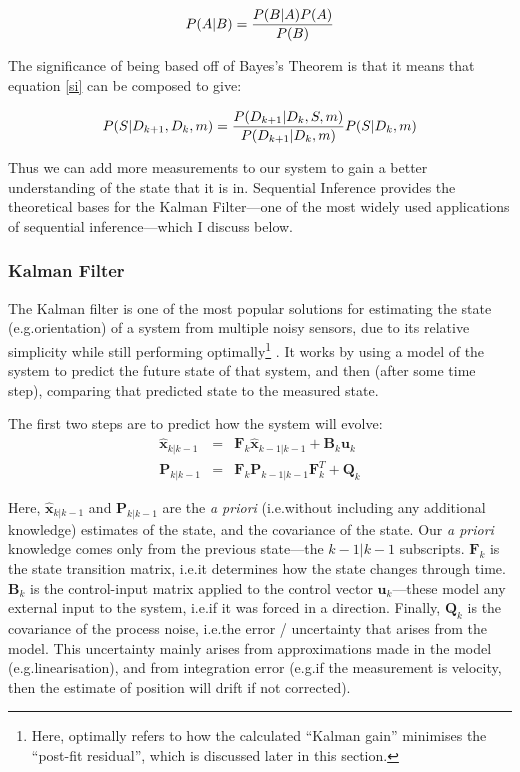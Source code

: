 \documentclass[12pt]{article}
\begin{document}
\begin{equation}
	P(A | B) = {P(B|A) P(A) \over P(B)}
\end{equation}

The significance of being based off of Bayes's Theorem is that it means that equation \ref{si} can be composed to give:

\begin{equation}
	P(S|D_{k+1},D_k,m) = {P(D_{k+1}|D_k,S,m) \over P(D_{k+1}|D_k,m)} P(S | D_k, m)
\end{equation}

\noindent Thus we can add more measurements to our system to gain a better understanding of the state that it is in. Sequential Inference provides the theoretical bases for the Kalman Filter---one of the most widely used applications of sequential inference---which I discuss below.

\subsubsection{Kalman Filter}

The Kalman filter \cite{kalman_1960} is one of the most popular solutions for estimating the state (e.g.\@ orientation) of a system from multiple noisy sensors, due to its relative simplicity while still performing optimally\footnote{Here, optimally refers to how the calculated ``Kalman gain'' minimises the ``post-fit residual'', which is discussed later in this section.} \cite{wangyan_2015}. It works by using a model of the system to predict the future state of that system, and then (after some time step), comparing that predicted state to the measured state.

The first two steps are to predict how the system will evolve:
\begin{eqnarray}
	\mathbf{\hat{x}}_{k | k-1} &=& \mathbf{F}_k \mathbf{\hat{x}}_{k-1|k-1} + \mathbf{B}_k \mathbf{u}_k \\
	\mathbf{P}_{k|k-1} &=& \mathbf{F}_k \mathbf{P}_{k-1 | k-1} \mathbf{F}^T_k + \mathbf{Q}_k
\end{eqnarray}

Here, $\mathbf{\hat{x}}_{k | k-1}$ and $\mathbf{P}_{k|k-1}$ are the \emph{a priori} (i.e.\@ without including any additional knowledge) estimates of the state, and the covariance of the state. Our \emph{a priori} knowledge comes only from the previous state---the $k-1|k-1$ subscripts. $\mathbf{F}_k$ is the state transition matrix, i.e.\@ it determines how the state changes through time. $\mathbf{B}_k$ is the control-input matrix applied to the control vector $\mathbf{u}_k$---these model any external input to the system, i.e.\@ if it was forced in a direction. Finally, $\mathbf{Q}_k$ is the covariance of the process noise, i.e.\@ the error / uncertainty that arises from the model. This uncertainty mainly arises from approximations made in the model (e.g.\@ linearisation), and from integration error (e.g.\@ if the measurement is velocity, then the estimate of position will drift if not corrected).
\end{document}
